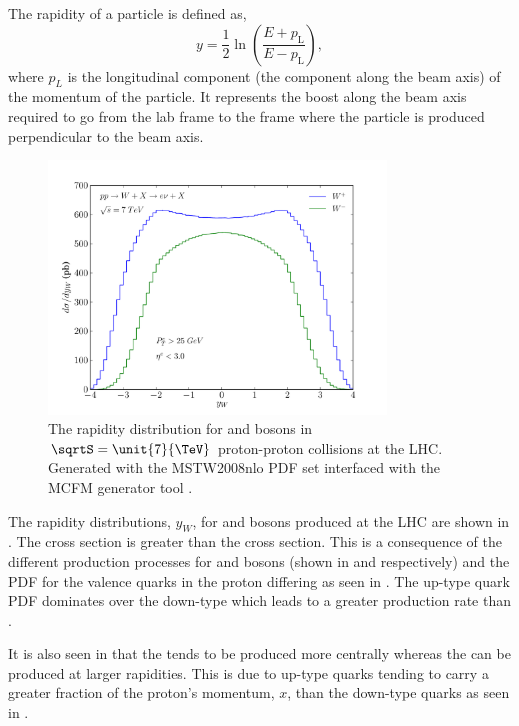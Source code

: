 The rapidity of a particle is defined as,
\begin{equation}
    y = \frac{1}{2} \ln \left(\frac{E+p_\text{L}}{E-p_\text{L}}\right),
\end{equation}
where $p_{L}$ is the longitudinal component (the component along the beam axis)
of the momentum of the particle. It represents the boost along the beam axis
required to go from the lab frame to the frame where the particle is produced
perpendicular to the beam axis.
\begin{figure}[htbp]
  \centering
  \includegraphics[width=0.8\textwidth]{w-rapidity}
  \caption[The rapidity distribution for \PWp and \PWm bosons in
${\sqrtS=\unit{7}{\TeV}}$ proton-proton collisions at the LHC.] {The rapidity
distribution for \PWp and \PWm bosons in $\sqrtS=\unit{7}{\TeV}$ proton-proton
collisions at the LHC.  Generated with the MSTW2008nlo
PDF set\cite{martin2009parton} interfaced with the MCFM generator tool \cite{campbellmcfm}.}
  \label{wbos:wrapid}
\end{figure}

The rapidity distributions, $y_W$, for \PWp and \PWm bosons produced at the
{LHC} are shown in .  The \PWp cross section is greater
than the \PWm cross section.  This is a consequence of the different production
processes for \PWp and \PWm bosons (shown in  and
 respectively) and the {PDF} for the valence quarks in
the proton differing as seen in . The up-type quark
{PDF} dominates over the down-type which leads to a greater \PWp production rate
than \PWm.

It is also seen in  that the \PWm tends to be produced
more centrally whereas the \PWp can be produced at larger rapidities. This is due
to up-type quarks tending to carry a greater fraction of the proton's momentum,
$x$, than the down-type quarks as seen in .

